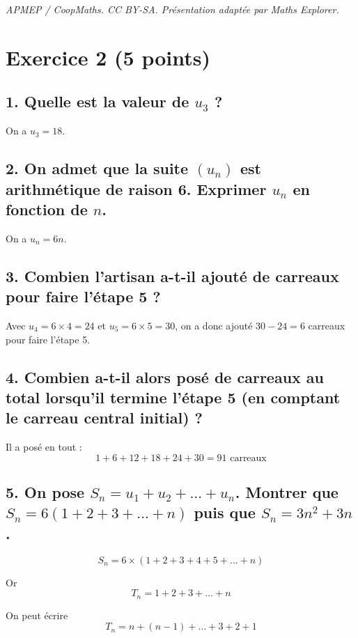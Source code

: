 \documentclass[10pt]{article}
\begin{document}
\noindent\textit{APMEP / CoopMaths. CC BY-SA. Présentation adaptée par Maths Explorer.}\par\medskip
\section*{Exercice 2 (5 points)}
	

	
	\subsection*{1. Quelle est la valeur de $u_3$ ?}
	
	On a $u_3 = 18$.
	
	\subsection*{2. On admet que la suite $(u_n)$ est arithmétique de raison 6. Exprimer $u_n$ en fonction de $n$.}
	
	On a $u_n = 6n$.
	
	\subsection*{3. Combien l’artisan a-t-il ajouté de carreaux pour faire l’étape 5 ?}
	
	Avec $u_4 = 6 \times 4 = 24$ et $u_5 = 6 \times 5 = 30$, on a donc ajouté $30 - 24 = 6$ carreaux pour faire l’étape 5.
	
	\subsection*{4. Combien a-t-il alors posé de carreaux au total lorsqu’il termine l’étape 5 (en comptant le carreau central initial) ?}
	
	Il a posé en tout :
	\[
	1 + 6 + 12 + 18 + 24 + 30 = 91 \text{ carreaux}
	\]
	
	\subsection*{5. On pose $S_n = u_1 + u_2 + \dots + u_n$. Montrer que $S_n = 6(1 + 2 + 3 + \dots + n)$ puis que $S_n = 3n^2 + 3n$.}
	
	\[
	S_n = 6 \times (1 + 2 + 3 + 4 + 5 + \dots + n)
	\]
	
	Or
	\[
	T_n = 1 + 2 + 3 + \dots + n
	\]
	
	On peut écrire
	\[
	T_n = n + (n-1) + \dots + 3 + 2 + 1
	\]
	
\end{document}
